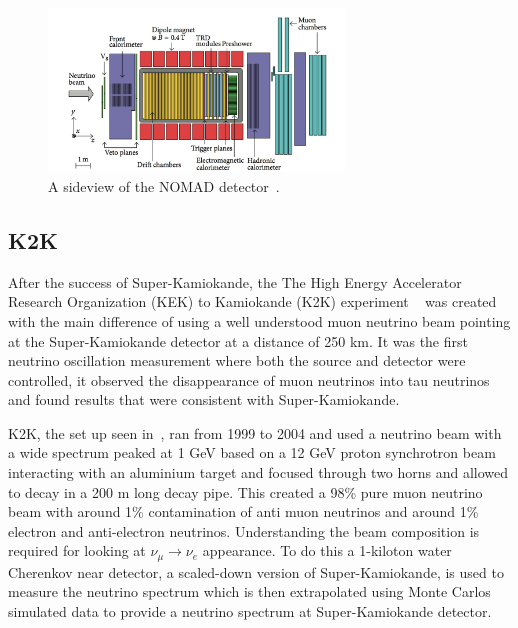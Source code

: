 \begin{figure}[h!]
\centering
  \centering
\includegraphics[width=0.7\textwidth]{figures/NOMAD2.jpeg}
\vspace{2mm}
\caption{A sideview of the NOMAD detector~\cite{69NOMAD}.}
\label{fig:NOMAD}
\end{figure}

\subsection{K2K}
After the success of Super-Kamiokande, the The High Energy Accelerator Research Organization (KEK) to Kamiokande (K2K) experiment ~\cite{22K2K} was created with the main difference of using a well understood muon neutrino beam pointing at the Super-Kamiokande detector at a distance of 250 km. It was the first neutrino oscillation measurement where both the source and detector were controlled, it observed the disappearance of muon neutrinos into tau neutrinos and found results that were consistent with Super-Kamiokande.

K2K, the set up seen in~, ran from 1999 to 2004 and used a neutrino beam with a wide spectrum peaked at 1 GeV based on a 12 GeV proton synchrotron beam interacting with an aluminium target and focused through two horns and allowed to decay in a 200 m long decay pipe. This created a 98\% pure muon neutrino beam with around 1\% contamination of anti muon neutrinos and around 1\% electron and anti-electron neutrinos. Understanding the beam composition is required for looking at $\nu_\mu \rightarrow \nu_e$ appearance. To do this a 1-kiloton water Cherenkov near detector,  a scaled-down version of Super-Kamiokande, is used to measure the neutrino spectrum which is then extrapolated using Monte Carlos simulated data to provide a neutrino spectrum at Super-Kamiokande detector.

